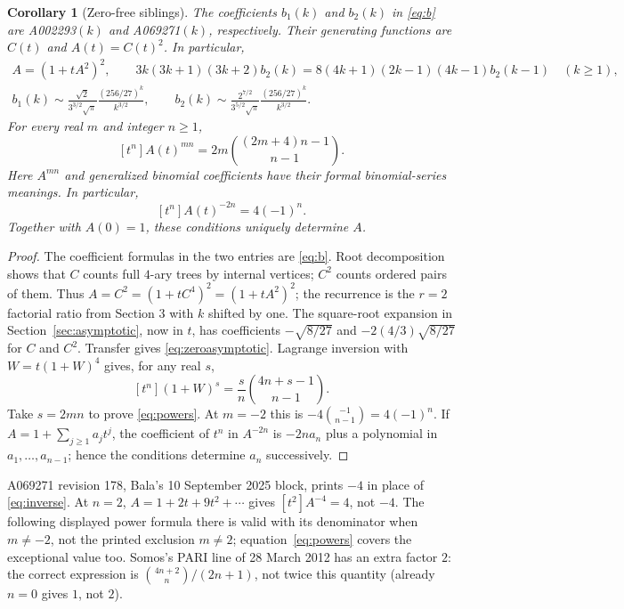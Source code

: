 \documentclass[11pt]{article}
\newtheorem{corollary}[theorem]{Corollary}
\begin{document}
\begin{corollary}[Zero-free siblings]\label{cor:zerofree}
The coefficients $b_1(k)$ and $b_2(k)$ in \eqref{eq:b} are A002293$(k)$
and A069271$(k)$, respectively. Their generating functions are $C(t)$ and
$A(t)=C(t)^2$. In particular,
\begin{gather}\label{eq:A}
 A=(1+tA^2)^2,\qquad
 3k(3k+1)(3k+2)b_2(k)=8(4k+1)(2k-1)(4k-1)b_2(k-1)
 \quad(k\geq1),\\
 b_1(k)\sim\frac{\sqrt2}{3^{3/2}\sqrt\pi}
        \frac{(256/27)^k}{k^{3/2}},\qquad
 b_2(k)\sim\frac{2^{7/2}}{3^{5/2}\sqrt\pi}
        \frac{(256/27)^k}{k^{3/2}}.\label{eq:zeroasymptotic}
\end{gather}
For every real $m$ and integer $n\geq1$,
\begin{equation}\label{eq:powers}
 [t^n]A(t)^{mn}=2m\binom{(2m+4)n-1}{n-1}.
\end{equation}
Here $A^{mn}$ and generalized binomial coefficients have their formal
binomial-series meanings. In particular,
\begin{equation}\label{eq:inverse}
 [t^n]A(t)^{-2n}=4(-1)^n.
\end{equation}
Together with $A(0)=1$, these conditions uniquely determine $A$.
\end{corollary}
\begin{proof}
The coefficient formulas in the two entries \cite{oeis4,oeis5} are
\eqref{eq:b}. Root decomposition shows that $C$ counts full $4$-ary trees
by internal vertices; $C^2$ counts ordered pairs of them.
Thus $A=C^2=(1+tC^4)^2=(1+tA^2)^2$; the recurrence
is the $r=2$ factorial ratio from Section 3 with $k$ shifted by one.
The square-root expansion in Section~\ref{sec:asymptotic}, now in $t$,
has coefficients $-\sqrt{8/27}$ and $-2(4/3)\sqrt{8/27}$ for $C$ and
$C^2$. Transfer gives \eqref{eq:zeroasymptotic}.
Lagrange inversion with $W=t(1+W)^4$ gives, for any real $s$,
\[
 [t^n](1+W)^s=\frac{s}{n}\binom{4n+s-1}{n-1}.
\]
Take $s=2mn$ to prove \eqref{eq:powers}. At $m=-2$ this is
$-4\binom{-1}{n-1}=4(-1)^n$. If $A=1+\sum_{j\geq1}a_jt^j$,
the coefficient of $t^n$ in $A^{-2n}$ is $-2na_n$ plus a polynomial
in $a_1,\ldots,a_{n-1}$; hence the conditions determine $a_n$ successively.
\end{proof}
A069271 revision 178, Bala's 10 September 2025 block, prints $-4$ in
place of \eqref{eq:inverse}. At $n=2$, $A=1+2t+9t^2+\cdots$ gives
$[t^2]A^{-4}=4$, not $-4$. The following displayed power formula there
is valid with its denominator when $m\ne-2$, not the printed exclusion
$m\ne2$; equation~\eqref{eq:powers} covers the exceptional value too.
Somos's PARI line of 28 March 2012 has an extra factor $2$:
the correct expression is $\binom{4n+2}{n}/(2n+1)$, not twice this
quantity (already $n=0$ gives $1$, not $2$).
\end{document}
